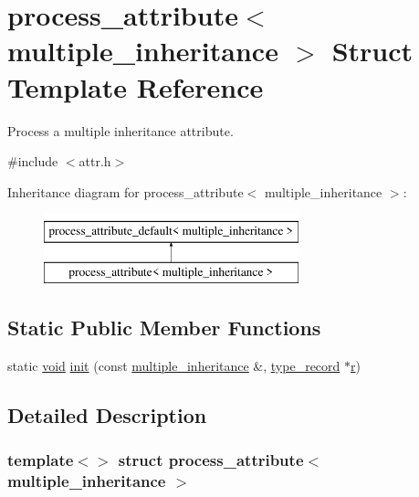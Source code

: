 \hypertarget{structprocess__attribute_3_01multiple__inheritance_01_4}{}\section{process\+\_\+attribute$<$ multiple\+\_\+inheritance $>$ Struct Template Reference}
\label{structprocess__attribute_3_01multiple__inheritance_01_4}


Process a multiple inheritance attribute.  




{\ttfamily \#include $<$attr.\+h$>$}

Inheritance diagram for process\+\_\+attribute$<$ multiple\+\_\+inheritance $>$\+:\begin{figure}[H]
\begin{center}
\leavevmode
\includegraphics[height=2.000000cm]{structprocess__attribute_3_01multiple__inheritance_01_4}
\end{center}
\end{figure}
\subsection*{Static Public Member Functions}
\begin{DoxyCompactItemize}
\item 
static \mbox{\hyperlink{_s_d_l__opengles2__gl2ext_8h_ae5d8fa23ad07c48bb609509eae494c95}{void}} \mbox{\hyperlink{structprocess__attribute_3_01multiple__inheritance_01_4_a1c4e9d7b5d49bd1887aab75ba8371192}{init}} (const \mbox{\hyperlink{structmultiple__inheritance}{multiple\+\_\+inheritance}} \&, \mbox{\hyperlink{structtype__record}{type\+\_\+record}} $\ast$\mbox{\hyperlink{_s_d_l__opengl_8h_a42ce7cdc612e53abee15043f80220d97}{r}})
\end{DoxyCompactItemize}


\subsection{Detailed Description}
\subsubsection*{template$<$$>$\newline
struct process\+\_\+attribute$<$ multiple\+\_\+inheritance $>$}

